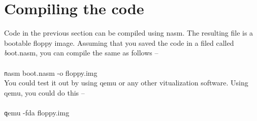 \documentclass{article}
\begin{document}
\section*{Compiling the code} Code in the previous section can be compiled
using nasm. The resulting file is a bootable floppy image. Assuming that you saved the code in a filed called {\emph boot.nasm}, you can compile the same as follows --\\
	      \\
 {\texttt nasm boot.nasm -o floppy.img}
	      \\

You could test it out by using qemu or any other vitualization software. Using qemu, you could do this -- \\
	    \\
{\texttt qemu -fda floppy.img}
\end{document}
